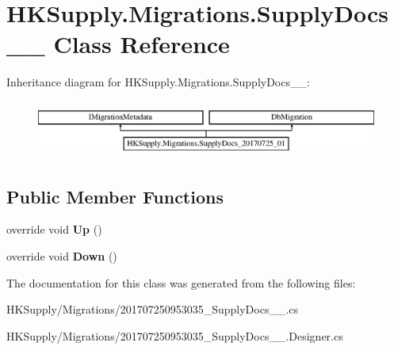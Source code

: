 \hypertarget{class_h_k_supply_1_1_migrations_1_1_supply_docs__20170725__01}{}\section{H\+K\+Supply.\+Migrations.\+Supply\+Docs\+\_\+\_ Class Reference}
\label{class_h_k_supply_1_1_migrations_1_1_supply_docs__20170725__01}
Inheritance diagram for H\+K\+Supply.\+Migrations.\+Supply\+Docs\+\_\+\_\+:\begin{figure}[H]
\begin{center}
\leavevmode
\includegraphics[height=1.898305cm]{class_h_k_supply_1_1_migrations_1_1_supply_docs__20170725__01}
\end{center}
\end{figure}
\subsection*{Public Member Functions}
\begin{DoxyCompactItemize}
\item 
\mbox{\label{class_h_k_supply_1_1_migrations_1_1_supply_docs__20170725__01_a9d70603b5ed5da7101ba7843049820f2}} 
override void {\bfseries Up} ()
\item 
\mbox{\label{class_h_k_supply_1_1_migrations_1_1_supply_docs__20170725__01_a02accb44a9b9d1c0834a9643608561bc}} 
override void {\bfseries Down} ()
\end{DoxyCompactItemize}


The documentation for this class was generated from the following files\+:\begin{DoxyCompactItemize}
\item 
H\+K\+Supply/\+Migrations/201707250953035\+\_\+\+Supply\+Docs\+\_\+\_.\+cs\item 
H\+K\+Supply/\+Migrations/201707250953035\+\_\+\+Supply\+Docs\+\_\+\_.\+Designer.\+cs\end{DoxyCompactItemize}
